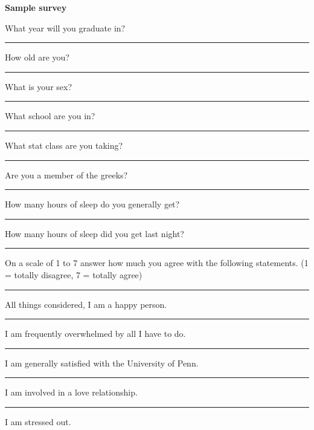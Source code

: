 \documentclass[12pt]{article}
\begin{document}
\centerline{\bf Sample survey}

\vspace{2em}

What year will you graduate in?  \rule{1in}{.5pt}

How old are you?  \rule{1in}{.5pt}

What is your sex? \rule{1in}{.5pt}

What school are you in? \rule{1in}{.5pt}

What stat class are you taking?  \rule{1in}{.5pt}

Are you a member of the greeks?  \rule{1in}{.5pt}

How many hours of sleep do you generally get?  \rule{1in}{.5pt}

How many hours of sleep did you get last night?  \rule{1in}{.5pt}

\vspace{2em}

On a scale of 1 to 7  answer how much you agree with the following
statements.  (1 = totally disagree, 7 = totally agree)


 \rule{1in}{.5pt} All things considered, I am a happy person.

 \rule{1in}{.5pt} I am frequently overwhelmed by all I have to do.  

 \rule{1in}{.5pt} I am generally satisfied with the University of
Penn.

 \rule{1in}{.5pt} I am involved in a love relationship.

 \rule{1in}{.5pt} I am stressed out.
\end{document}
